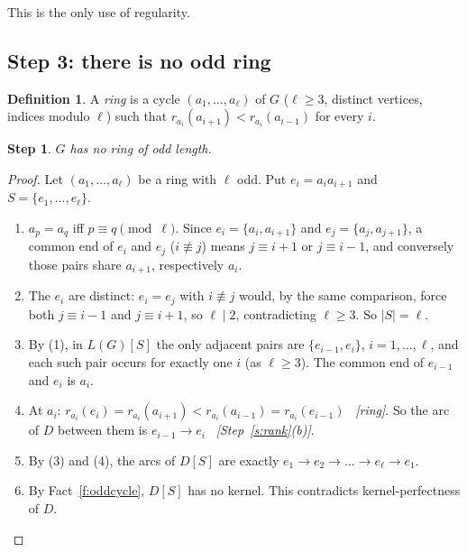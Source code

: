 \documentclass[11pt]{article}
\theoremstyle{plain}
\newtheorem{claim}{Step}
\theoremstyle{definition}
\newtheorem*{definition}{Definition}
\newcommand{\LG}{L(G)}
\newcommand{\why}[1]{\unskip\ \textit{[#1]}}
\newenvironment{steps}{\begin{enumerate}[label=(\arabic*),leftmargin=2.2em,itemsep=0.35em]}{\end{enumerate}}
\begin{document}
This is the only use of regularity.

\subsection*{Step 3: there is no odd ring}

\begin{definition}
A \emph{ring} is a cycle $(a_1,\dots,a_\ell)$ of $G$ ($\ell\ge 3$, distinct vertices, indices
modulo $\ell$) such that $r_{a_i}(a_{i+1})<r_{a_i}(a_{i-1})$ for every $i$.
\end{definition}

\begin{claim}\label{s:ring}
$G$ has no ring of odd length.
\end{claim}

\begin{proof}
Let $(a_1,\dots,a_\ell)$ be a ring with $\ell$ odd. Put $e_i=a_ia_{i+1}$ and
$S=\{e_1,\dots,e_\ell\}$.
\begin{steps}
  \item $a_p=a_q$ iff $p\equiv q\pmod\ell$. Since $e_i=\{a_i,a_{i+1}\}$ and
    $e_j=\{a_j,a_{j+1}\}$, a common end of $e_i$ and $e_j$ ($i\not\equiv j$) means $j\equiv i+1$
    or $j\equiv i-1$, and conversely those pairs share $a_{i+1}$, respectively $a_i$.
  \item The $e_i$ are distinct: $e_i=e_j$ with $i\not\equiv j$ would, by the same comparison,
    force both $j\equiv i-1$ and $j\equiv i+1$, so $\ell\mid 2$, contradicting $\ell\ge 3$. So
    $|S|=\ell$.
  \item By (1), in $\LG[S]$ the only adjacent pairs are $\{e_{i-1},e_i\}$, $i=1,\dots,\ell$, and
    each such pair occurs for exactly one $i$ (as $\ell\ge 3$). The common end of $e_{i-1}$ and
    $e_i$ is $a_i$.
  \item At $a_i$: $r_{a_i}(e_i)=r_{a_i}(a_{i+1})<r_{a_i}(a_{i-1})=r_{a_i}(e_{i-1})$
    \why{ring}. So the arc of $D$ between them is $e_{i-1}\to e_i$ \why{Step~\ref{s:rank}(b)}.
  \item By (3) and (4), the arcs of $D[S]$ are exactly $e_1\to e_2\to\dots\to e_\ell\to e_1$.
  \item By Fact~\ref{f:oddcycle}, $D[S]$ has no kernel. This contradicts kernel-perfectness of
    $D$. \qedhere
\end{steps}
\end{proof}

\end{document}
